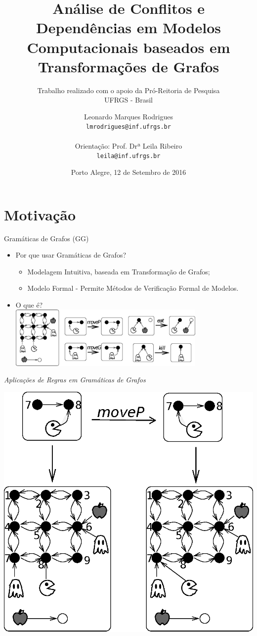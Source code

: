 \documentclass[xcolor=dvipsnames,pdf,10pt]{beamer}
\title     [Análise de Conflitos e Dependências em Modelos Computacionais baseados em Transformações de Grafos]
           {Análise de Conflitos e Dependências em Modelos Computacionais baseados em Transformações de Grafos}
\subtitle  {Trabalho realizado com o apoio da Pró-Reitoria de Pesquisa \\ UFRGS - Brasil}
\author     [Leonardo M. Rodrigues]
            {Leonardo Marques Rodrigues \\ \texttt{lmrodrigues@inf.ufrgs.br} \\~\\
            Orientação: Prof. Drª Leila Ribeiro \\ \texttt{leila@inf.ufrgs.br}}
\institute  {\inftitle}
\date       {Porto Alegre, 12 de Setembro de 2016}
\newcommand{\bi}{\begin{itemize}}
\newcommand{\ei}{\end{itemize}}
\newcommand{\tm}{\item}
\begin{document}
\titlepageINF

\tableofcontentsINF

\section{Motivação} 

\begin{frame}{Gramáticas de Grafos (GG)}

\bi 
    \tm Por que usar Gramáticas de Grafos? \\
        \bi
            \tm Modelagem Intuitiva, baseada em Transformação de Grafos;
            \tm Modelo Formal - Permite Métodos de Verificação Formal de Modelos. \\
        \ei    
    
    \vspace{0.25cm}
    \tm O que é? \\
        \vspace{0.25cm}
        \includegraphics[height=3cm, keepaspectratio]{./pacman/gramatica.eps}

\ei 

\end{frame}

\begin{frame}{\textit{Aplicações de Regras em Gramáticas de Grafos}}

\centering
\includegraphics[height=0.8\paperheight,keepaspectratio]{./pacman/ex_aplic_1.eps}

\end{frame}
\end{document}
